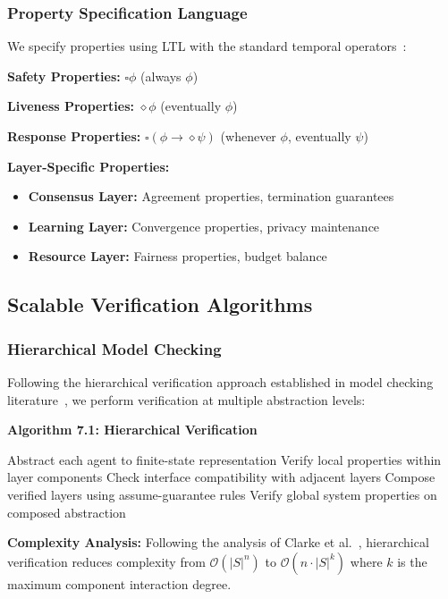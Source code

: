 \documentclass[conference]{IEEEtran}
\newcommand{\bigO}{\mathcal{O}}
\begin{document}
\subsubsection{Property Specification Language}

We specify properties using LTL with the standard temporal operators~\cite{pnueli1977temporal}:

\textbf{Safety Properties:} $\square \phi$ (always $\phi$)

\textbf{Liveness Properties:} $\diamond \phi$ (eventually $\phi$)

\textbf{Response Properties:} $\square(\phi \rightarrow \diamond \psi)$ (whenever $\phi$, eventually $\psi$)

\textbf{Layer-Specific Properties:}
\begin{itemize}
    \item \textbf{Consensus Layer:} Agreement properties, termination guarantees
    \item \textbf{Learning Layer:} Convergence properties, privacy maintenance
    \item \textbf{Resource Layer:} Fairness properties, budget balance
\end{itemize}

\subsection{Scalable Verification Algorithms}

\subsubsection{Hierarchical Model Checking}

Following the hierarchical verification approach established in model checking literature~\cite{clarke1999model}, we perform verification at multiple abstraction levels:

\textbf{Algorithm 7.1: Hierarchical Verification}
\begin{algorithmic}[1]
\STATE Abstract each agent to finite-state representation
    \STATE Verify local properties within layer components
    \STATE Check interface compatibility with adjacent layers
\ENDFOR
\STATE Compose verified layers using assume-guarantee rules
\STATE Verify global system properties on composed abstraction
\end{algorithmic}

\textbf{Complexity Analysis:} Following the analysis of Clarke et al.~\cite{clarke1999model}, hierarchical verification reduces complexity from $\bigO(|S|^n)$ to $\bigO(n \cdot |S|^k)$ where $k$ is the maximum component interaction degree.
\end{document}
